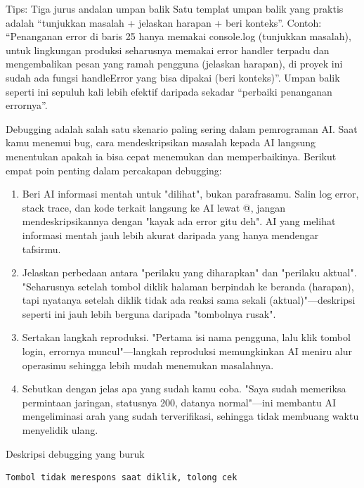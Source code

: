 \begin{tcbinfo}{Tips: Tiga jurus andalan umpan balik}
Satu templat umpan balik yang praktis adalah “tunjukkan masalah + jelaskan harapan + beri konteks”. Contoh: “Penanganan error di baris 25 hanya memakai console.log (tunjukkan masalah), untuk lingkungan produksi seharusnya memakai error handler terpadu dan mengembalikan pesan yang ramah pengguna (jelaskan harapan), di proyek ini sudah ada fungsi handleError yang bisa dipakai (beri konteks)”. Umpan balik seperti ini sepuluh kali lebih efektif daripada sekadar “perbaiki penanganan errornya”.

\end{tcbinfo}


Debugging adalah salah satu skenario paling sering dalam pemrograman AI. Saat kamu menemui bug, cara mendeskripsikan masalah kepada AI langsung menentukan apakah ia bisa cepat menemukan dan memperbaikinya. Berikut empat poin penting dalam percakapan debugging:

\begin{enumerate}
  \item Beri AI informasi mentah untuk "dilihat", bukan parafrasamu. Salin log error, stack trace, dan kode terkait langsung ke AI lewat @, jangan mendeskripsikannya dengan "kayak ada error gitu deh". AI yang melihat informasi mentah jauh lebih akurat daripada yang hanya mendengar tafsirmu.
  \item Jelaskan perbedaan antara "perilaku yang diharapkan" dan "perilaku aktual". "Seharusnya setelah tombol diklik halaman berpindah ke beranda (harapan), tapi nyatanya setelah diklik tidak ada reaksi sama sekali (aktual)"—deskripsi seperti ini jauh lebih berguna daripada "tombolnya rusak".
  \item Sertakan langkah reproduksi. "Pertama isi nama pengguna, lalu klik tombol login, errornya muncul"—langkah reproduksi memungkinkan AI meniru alur operasimu sehingga lebih mudah menemukan masalahnya.
  \item Sebutkan dengan jelas apa yang sudah kamu coba. "Saya sudah memeriksa permintaan jaringan, statusnya 200, datanya normal"—ini membantu AI mengeliminasi arah yang sudah terverifikasi, sehingga tidak membuang waktu menyelidik ulang.
\end{enumerate}

Deskripsi debugging yang buruk

\begin{lstlisting}
Tombol tidak merespons saat diklik, tolong cek
\end{lstlisting}


